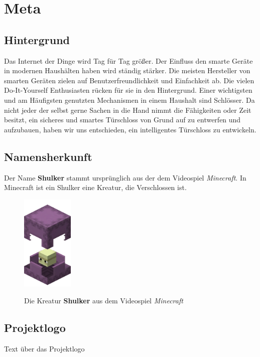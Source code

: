 \chapter{Meta}

\section{Hintergrund}

Das Internet der Dinge wird Tag für Tag größer. Der Einfluss den smarte Geräte in modernen Haushälten haben wird ständig stärker. Die meisten Hersteller von smarten Geräten zielen auf Benutzerfreundlichkeit und Einfachkeit ab. Die vielen Do-It-Yourself Enthusiasten rücken für sie in den Hintergrund. Einer wichtigsten und am Häufigsten genutzten Mechanismen in einem Haushalt sind Schlösser.  Da nicht jeder der selbst gerne Sachen in die Hand nimmt die Fähigkeiten oder Zeit besitzt, ein sicheres und smartes Türschloss von Grund auf zu entwerfen und aufzubauen, haben wir uns entschieden, ein intelligentes Türschloss zu entwickeln.

\section{Namensherkunft}

Der Name \textbf{Shulker} stammt ursprünglich aus der dem Videospiel \textit{Minecraft}. In Minecraft ist ein Shulker eine Kreatur, die Verschlossen ist.

\begin{figure}[H]
    \begin{center}
        \includegraphics[width=0.22\textwidth]{images/Intro/Shulker.png}
        \caption{Die Kreatur \textbf{Shulker} aus dem Videospiel \textit{Minecraft}}
        \cite{mcwiki2015}
    \end{center}
\end{figure}

\newpage

\section{Projektlogo}

Text über das Projektlogo